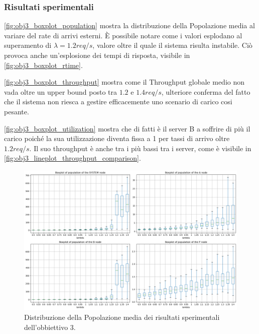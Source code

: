 \subsubsection{Risultati sperimentali}

\autoref{fig:obj3_boxplot_population} mostra la distribuzione della Popolazione media al variare del rate di arrivi esterni. È possibile notare come i valori esplodano al superamento di $\lambda = 1.2 req/s$, valore oltre il quale il sistema risulta instabile. Ciò provoca anche un'esplosione dei tempi di risposta, visibile in \autoref{fig:obj3_boxplot_rtime}.

\autoref{fig:obj3_boxplot_throughput} mostra come il Throughput globale medio non vada oltre un upper bound posto tra $1.2$ e $1.4 req/s$, ulteriore conferma del fatto che il sistema non riesca a gestire efficacemente uno scenario di carico cosi pesante.

\autoref{fig:obj3_boxplot_utilization} mostra che di fatti è il server B a soffrire di più il carico poiché la sua utilizzazione diventa fissa a 1 per tassi di arrivo oltre $1.2 req/s$. Il suo throughput è anche tra i più bassi tra i server, come è visibile in \autoref{fig:obj3_lineplot_throughput_comparison}. 

\begin{figure}
    \centering
    \includegraphics[width=1\linewidth]{figs//results//obj3//simulation/obj3_boxplots_population.png}
    \caption{Distribuzione della Popolazione media dei risultati sperimentali dell'obbiettivo 3.}
    \label{fig:obj3_boxplot_population}
\end{figure}

